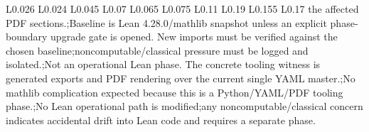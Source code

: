 \begin{longtable}{L{0.026\linewidth} L{0.024\linewidth} L{0.045\linewidth} L{0.07\linewidth} L{0.065\linewidth} L{0.075\linewidth} L{0.11\linewidth} L{0.19\linewidth} L{0.155\linewidth} L{0.17\linewidth}}
the affected PDF sections.;\newline Baseline is Lean 4.28.0/\allowbreak{}mathlib snapshot unless an explicit phase-boundary upgrade gate is opened. New imports must be verified against the chosen baseline;\newline noncomputable/\allowbreak{}classical pressure must be logged and isolated.;\newline Not an operational Lean phase. The concrete tooling witness is generated exports and PDF rendering over the current single YAML master.;\newline No mathlib complication expected because this is a Python/\allowbreak{}YAML/\allowbreak{}PDF tooling phase.;\newline No Lean operational path is modified;\newline any noncomputable/\allowbreak{}classical concern indicates accidental drift into Lean code and requires a separate phase.\\
\hline
\addlinespace[0.24em]

\end{longtable}
